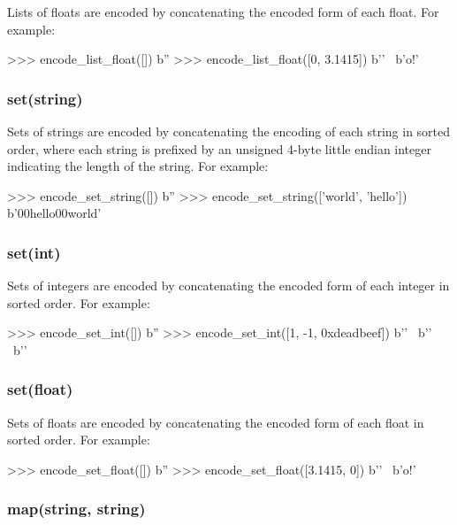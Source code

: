 Lists of floats are encoded by concatenating the encoded form of each float.
For example:

\begin{pythoncode}
>>> encode_list_float([])
b''
>>> encode_list_float([0, 3.1415])
b'' \
b'o\xca!\t@'
\end{pythoncode}

\subsubsection{set(string)}

Sets of strings are encoded by concatenating the encoding of each string in
sorted order, where each string is prefixed by an unsigned 4-byte little endian
integer indicating the length of the string.  For example:

\begin{pythoncode}
>>> encode_set_string([])
b''
>>> encode_set_string(['world', 'hello'])
b'\x00\x00hello\x05\x00\x00\x00world'
\end{pythoncode}

\subsubsection{set(int)}

Sets of integers are encoded by concatenating the encoded form of each integer
in sorted order.  For example:

\begin{pythoncode}
>>> encode_set_int([])
b''
>>> encode_set_int([1, -1, 0xdeadbeef])
b'\xff\xff\xff\xff\xff\xff\xff\xff' \
b'' \
b'\xef\xbe\xad\xde{}'
\end{pythoncode}

\subsubsection{set(float)}

Sets of floats are encoded by concatenating the encoded form of each float in
sorted order.  For example:

\begin{pythoncode}
>>> encode_set_float([])
b''
>>> encode_set_float([3.1415, 0])
b'\x00\x00\x00\x00' \
b'o\xca!\t@'
\end{pythoncode}

\subsubsection{map(string, string)}

